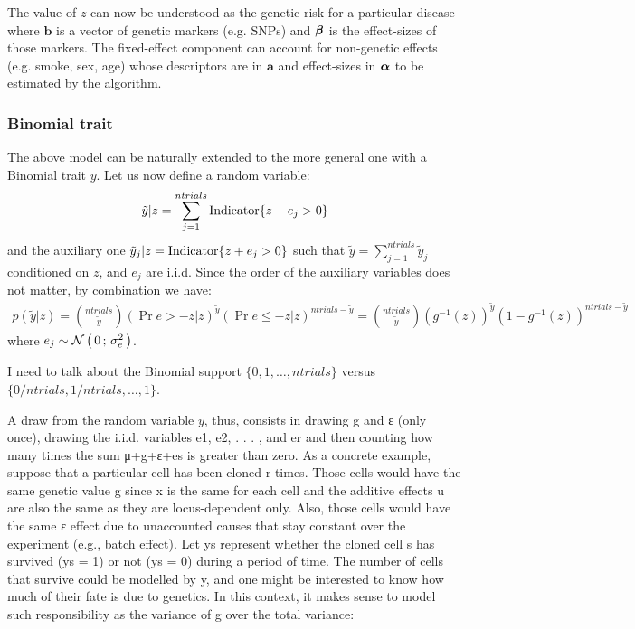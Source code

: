 The value of $z$ can now be understood as the genetic risk for a particular
disease where $\mathbf b$ is a vector of genetic markers (e.g. SNPs) and
$\boldsymbol\beta$ is the effect-sizes of those markers. The fixed-effect component can
account for non-genetic effects (e.g. smoke, sex, age) whose descriptors are in
$\mathbf a$ and effect-sizes in $\boldsymbol\alpha$ to be estimated by the algorithm.

\subsubsection{Binomial trait}

The above model can be naturally extended to the more general one with a Binomial
trait $y$. Let us now define a random variable:
\begin{align*}
\tilde y | z = \sum_{j=1}^{ntrials} \text{Indicator}\{ {z+e_j > 0} \}
\end{align*}
and the auxiliary one $\tilde y_j | z = \text{Indicator}\{ {z+e_j > 0} \}$ such that
$\tilde y = \sum_{j=1}^{ntrials} \tilde y_j$ conditioned on $z$, and $e_j$
are i.i.d. Since the order of the auxiliary variables does not matter, by
combination we have:
\begin{align*}
p(\tilde y|z) = {ntrials \choose \tilde y} (\Pr{e > -z|z})^{\tilde y}
  (\Pr{e \leq -z|z})^{ntrials - \tilde y} =
	{ntrials \choose \tilde y} (g^{-1}(z))^{\tilde y} (1-g^{-1}(z))^{ntrials - \tilde y}
\end{align*}
where $e_j \sim \mathcal{N}\left(\, {0} \,;\, {\sigma_e^2} \,\right)$.

I need to talk about the Binomial support $\{0, 1, \dots, ntrials\}$ versus
$\{0/ntrials, 1/ntrials, \dots, 1\}$.

A draw from the random variable $y$, thus, consists in drawing g and ε (only once),
drawing the i.i.d. variables e1, e2, . . . , and er and then counting how many
times the sum μ+g+ε+es is greater than zero. As a concrete example, suppose that
a particular cell has been cloned r times. Those cells would have the same
genetic value g since x is the same for each cell and the additive effects u are
also the same as they are locus-dependent only. Also, those cells would have the
same ε effect due to unaccounted causes that stay constant over the experiment
(e.g., batch effect). Let ys represent whether the cloned cell s has survived
(ys = 1) or not (ys = 0) during a period of time. The number of cells that
survive could be modelled by y, and one might be interested to know how much of
their fate is due to genetics. In this context, it makes sense to model such
responsibility as the variance of g over the total variance:

